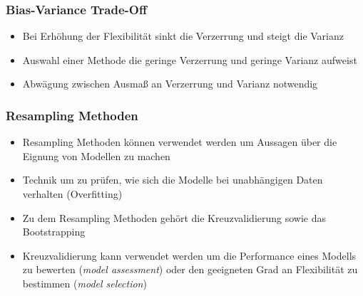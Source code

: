 \documentclass{beamer}
\begin{document}
\begin{frame}
  \frametitle{Bias-Variance Trade-Off}  
  \begin{itemize}
  \item Bei Erhöhung der Flexibilität sinkt die Verzerrung und steigt die Varianz
  \item Auswahl einer Methode die geringe Verzerrung und geringe Varianz aufweist
  \item Abwägung zwischen Ausmaß an Verzerrung und Varianz notwendig
  \end{itemize}  
\end{frame}

\begin{frame}
  \frametitle{Resampling Methoden} 
  \begin{itemize}
  \item Resampling Methoden können verwendet werden um Aussagen über die Eignung von Modellen zu machen
  \item Technik um zu prüfen, wie sich die Modelle bei unabhängigen Daten verhalten (Overfitting)
  \item Zu dem Resampling Methoden gehört die Kreuzvalidierung sowie das Bootstrapping
  \item Kreuzvalidierung kann verwendet werden um die Performance eines Modells zu bewerten (\emph{model assessment}) oder den geeigneten Grad an Flexibilität zu bestimmen (\emph{model selection})
    \end{itemize}  
\end{frame}
\end{document}
